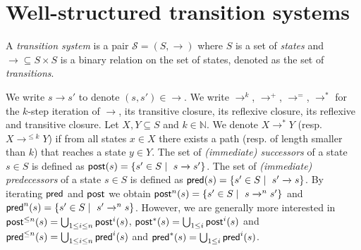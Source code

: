 


\section{Well-structured transition systems}\label{section definitions}







\noindent
 A {\em transition system} is a pair $\mathscr{S} = (S,\rightarrow )$ where $S$ is a set of 
 {\em states} and  
 $ {\rightarrow} \subseteq S \times S$ is a
 binary relation 
 on
 the set of states, denoted as the set of {\em transitions}. 
%
\iffalse
\mathieu{ Maybe add this back ?
A {\em labeled transition system} (LTS for short) is a tuple $\mathscr{S}=(S, \Sigma, \rightarrow)$ where 
$S$ is a set of {\em states}, $\Sigma$ is a (finite) set of {\em labels}, and 
${\rightarrow} \subseteq S\times \Sigma \times S$ is a 
ternary relation,
denoted as the set of {\em labeled transitions}. }
\fi
%
We write $s \rightarrow s'$ to denote $ (s,s') \in  {\rightarrow} $.
We write $\rightarrow^{k}$, $\rightarrow^{+}$, $\rightarrow^{=}$, $\rightarrow^{*}$
for the $k$-step iteration of $\rightarrow$, its transitive closure, its reflexive closure, its reflexive and transitive closure.
Let $X,Y \subseteq S$ and $k \in \mathbb{N}$. We denote $X \longrightarrow^{*} Y$ (resp. $X \longrightarrow^{\leq k} Y$) if from all states $x \in X$ there exists a path (resp. of length smaller than $k$) that reaches a state $y \in Y$.
\noindent
The set of {\em (immediate) successors} of a state $s \in S$ is defined as 
 $\textsf{post}(s) = \{ s' \in S \mid  ~ s \xrightarrow{} s'\}$. 
The set of {\em (immediate) predecessors} of a state $s \in S$ is deﬁned as
 $\textsf{pred}(s) = \{ s' \in S \mid  ~ s' \xrightarrow{} s\}$. 
By iterating $\textsf{pred}$ and $\textsf{post}$ we obtain  
$\textsf{post}^n(s) = \{ s' \in S \mid  ~ s \xrightarrow{}^n s'\}$
and
$\textsf{pred}^n(s) = \{ s' \in S \mid  ~ s' \xrightarrow{}^n s\}$.
However, we are generally more interested in
$\textsf{post}^{\leq n}(s) = \bigcup_{1 \leq i \leq n} \textsf{post}^i(s)$, $\textsf{post}^*(s)= \bigcup_{1 \leq i} \textsf{post}^i(s)$
and
$\textsf{pred}^{\leq n}(s) = \bigcup_{1 \leq i \leq n} \textsf{pred}^i(s)$ and $\textsf{pred}^*(s) = \bigcup_{1 \leq i} \textsf{pred}^i(s)$. %

